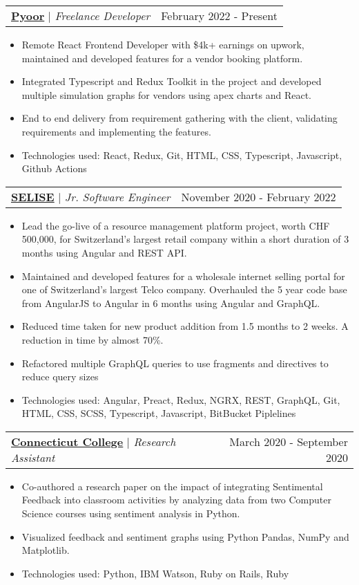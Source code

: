 \documentclass[letterpaper,11pt]{article}
\makeatletter
\newcommand{\resumeItem}[1]{
  \item\small{
    {#1 \vspace{-2pt}}
  }
}
\newcommand{\resumeProjectHeading}[2]{
    \item
    \begin{tabular*}{0.97\textwidth}{l@{\extracolsep{\fill}}r}
      \small#1 & #2 \\
    \end{tabular*}\vspace{-7pt}
}
\newcommand{\resumeItemListStart}{\begin{itemize}}
\newcommand{\resumeItemListEnd}{\end{itemize}\vspace{-5pt}}
\makeatother
\begin{document}
\resumeProjectHeading
      {{\textbf{\href{https://pyoor.co}{Pyoor}} $|$ \emph{Freelance Developer}}}{February 2022 - Present}
      \resumeItemListStart
        \resumeItem{Remote React Frontend Developer with \$4k+ earnings on upwork, maintained and developed features for a vendor booking platform.}
        \resumeItem{Integrated Typescript and Redux Toolkit in the project and developed multiple simulation graphs for vendors using apex charts and React.}
        \resumeItem{End to end delivery from requirement gathering with the client, validating requirements and implementing the features.}
        \resumeItem{Technologies used: React, Redux, Git, HTML, CSS, Typescript, Javascript, Github Actions}
      \resumeItemListEnd
    \resumeProjectHeading
      {{\textbf{\href{https://selise.ch}{SELISE}} $|$ \emph{Jr. Software Engineer}}}{November 2020 - February 2022}
      \resumeItemListStart
        \resumeItem{Lead the go-live of a resource management platform project, worth CHF 500,000, for Switzerland’s largest retail company within a short duration of 3 months using Angular and REST API.}
        \resumeItem{Maintained and developed features for a wholesale internet selling portal for one of Switzerland’s largest Telco company. Overhauled the 5 year code base from AngularJS to Angular in 6 months using Angular and GraphQL.}
        \resumeItem{Reduced time taken for new product addition from 1.5 months to 2 weeks. A reduction in time by almost 70\%.}
        \resumeItem{Refactored multiple GraphQL queries to use fragments and directives to reduce query sizes}
        \resumeItem{Technologies used: Angular, Preact, Redux, NGRX, REST, GraphQL, Git, HTML, CSS, SCSS, Typescript, Javascript, BitBucket Piplelines}
      \resumeItemListEnd

      \resumeProjectHeading
      {{\textbf{\href{https://conncoll.edu}{Connecticut College}} $|$ \emph{Research Assistant}}}{March 2020 - September 2020}
      \resumeItemListStart
        \resumeItem{Co-authored a research paper on the impact of integrating Sentimental Feedback into classroom activities by analyzing data from two Computer Science courses using sentiment analysis in Python.}
        \resumeItem{Visualized feedback and sentiment graphs using Python Pandas, NumPy and Matplotlib.
        }
        \resumeItem{Technologies used: Python, IBM Watson, Ruby on Rails, Ruby}
      \resumeItemListEnd
      
\end{document}
